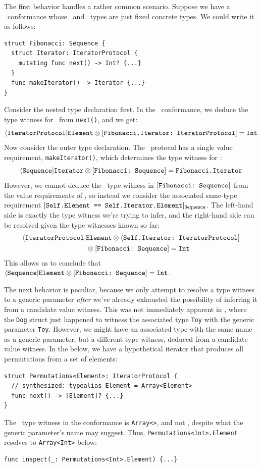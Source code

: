 \documentclass[../generics]{subfiles}
\begin{document}
\begin{example}\label{abstract type witness example}
The first behavior handles a rather common scenario. Suppose we have a \tSequence\ conformance whose \nElement\ and \nIterator\ types are just fixed concrete types. We could write it as follows:
\begin{Verbatim}
struct Fibonacci: Sequence {
  struct Iterator: IteratorProtocol {
    mutating func next() -> Int? {...}
  }
  func makeIterator() -> Iterator {...}
}
\end{Verbatim}
Consider the nested type declaration first. In the \tIterator\ conformance, we deduce the type witness for \nElement\ from \texttt{next()}, and we get:
\[\langle\texttt{IteratorProtocol}|\texttt{Element}\otimes[\texttt{Fibonacci.Iterator:~IteratorProtocol}]=\texttt{Int}\]
Now consider the outer type declaration. The \tSequence\ protocol has a single value requirement, \texttt{makeIterator()}, which determines the type witness for \nIterator:
\[\langle\texttt{Sequence}|\texttt{Iterator}\otimes[\texttt{Fibonacci:~Sequence}]=\texttt{Fibonacci.Iterator}\]
However, we cannot deduce the \nElement\ type witness in $[\texttt{Fibonacci:~Sequence}]$ from the value requirements of \tSequence, so instead we consider the associated same-type requirement $[\texttt{Self.Element == Self.Iterator.Element}]_{\texttt{Sequence}}$. The left-hand side is exactly the type witness we're trying to infer, and the right-hand side can be resolved given the type witnesses known so far:
\begin{gather*}
\langle\texttt{IteratorProtocol}|\texttt{Element} \otimes \langle\texttt{Self.Iterator:~IteratorProtocol}] \\
\qquad {} \otimes [\texttt{Fibonacci:~Sequence}] = \texttt{Int}
\end{gather*}
This allows us to conclude that $\langle\texttt{Sequence}|\texttt{Element} \otimes[\texttt{Fibonacci:~Sequence}] = \texttt{Int}$.
\end{example}

\begin{example}
The next behavior is peculiar, because we only attempt to resolve a type witness to a generic parameter \emph{after} we've already exhausted the possibility of inferring it from a candidate value witness. This was not immediately apparent in , where the \texttt{Dog} struct just happened to witness the associated type \texttt{Toy} with the generic parameter \texttt{Toy}. However, we might have an associated type with the same name as a generic parameter, but a different type witness, deduced from a candidate value witness. In the below, we have a hypothetical iterator that produces all permutations from a set of elements:
\begin{Verbatim}
struct Permutations<Element>: IteratorProtocol {
  // synthesized: typealias Element = Array<Element>
  func next() -> [Element]? {...}
}
\end{Verbatim}
The \nElement\ type witness in the conformance is \texttt{Array<\rT>}, and not \rT, despite what the generic parameter's name may suggest. Thus, \texttt{Permutations<Int>.Element} resolves to \texttt{Array<Int>} below:
\begin{Verbatim}
func inspect(_: Permutations<Int>.Element) {...}
\end{Verbatim}
\end{example}
\end{document}

